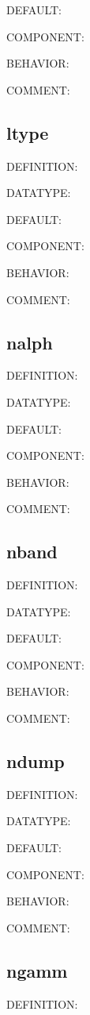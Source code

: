 {\color{blue}DEFAULT:}

{\color{brown}COMPONENT:}

{\color{purple}BEHAVIOR:}

{\color{olive}COMMENT:}

\subsection{ltype}
{\color{red}DEFINITION:}

{\color{green}DATATYPE:}

{\color{blue}DEFAULT:}

{\color{brown}COMPONENT:}

{\color{purple}BEHAVIOR:}

{\color{olive}COMMENT:}

\subsection{nalph}
{\color{red}DEFINITION:}

{\color{green}DATATYPE:}

{\color{blue}DEFAULT:}

{\color{brown}COMPONENT:}

{\color{purple}BEHAVIOR:}

{\color{olive}COMMENT:}

\subsection{nband}
{\color{red}DEFINITION:}

{\color{green}DATATYPE:}

{\color{blue}DEFAULT:}

{\color{brown}COMPONENT:}

{\color{purple}BEHAVIOR:}

{\color{olive}COMMENT:}

\subsection{ndump}
{\color{red}DEFINITION:}

{\color{green}DATATYPE:}

{\color{blue}DEFAULT:}

{\color{brown}COMPONENT:}

{\color{purple}BEHAVIOR:}

{\color{olive}COMMENT:}

\subsection{ngamm}
{\color{red}DEFINITION:}

